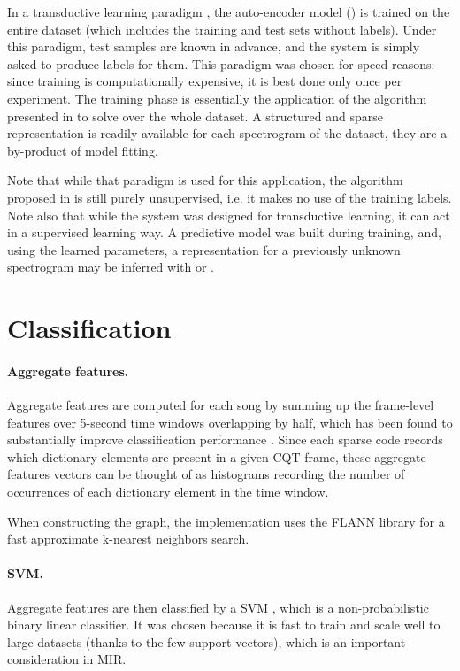 In a transductive learning paradigm \cite{vapnik1998transductiveLearning}, the auto-encoder model () is trained on the entire dataset (which includes the training and test sets without labels). Under this paradigm, test samples are known in advance, and the system is simply asked to produce labels for them. This paradigm was chosen for speed reasons: since training is computationally expensive, it is best done only once per experiment. The training phase is essentially the application of the algorithm presented in  to solve  over the whole dataset. A structured and sparse representation is readily available for each spectrogram of the dataset, they are a by-product of model fitting.

Note that while that paradigm is used for this application, the algorithm proposed in  is still purely unsupervised, i.e. it makes no use of the training labels.
Note also that while the system was designed for transductive learning, it can act in a supervised learning way. A predictive model was built during training, and, using the learned parameters, a representation for a previously unknown spectrogram may be inferred with  or .

\section{Classification}

\paragraph{Aggregate features.}
Aggregate features are computed for each song by summing up the frame-level features over 5-second time windows overlapping by half, which has been found to substantially improve classification performance \cite{bergstra2006aggregateFeatures, hamel2010aggregateFeatures}. Since each sparse code records which dictionary elements are present in a given \gls{CQT} frame, these aggregate features vectors can be thought of as histograms recording the number of occurrences of each dictionary element in the time window.

When constructing the graph, the implementation uses the FLANN library \cite{muja2009flann} for a fast approximate k-nearest neighbors search.

\paragraph{\gls{SVM}.}
Aggregate features are then classified by a \gls{SVM} \cite{cortes1995SVM}, which is a non-probabilistic binary linear classifier. It was chosen because it is fast to train and scale well to large datasets (thanks to the few support vectors), which is an important consideration in \gls{MIR}.

